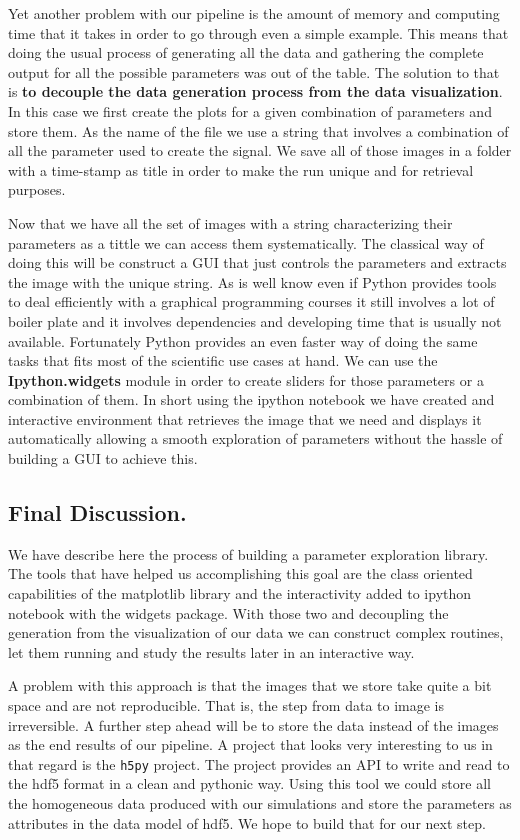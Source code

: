 \documentclass[11pt,a4paper]{article}
\begin{document}
Yet another problem with our pipeline is the amount of memory and
computing time that it takes in order to go through even a simple
example. This means that doing the usual process of generating all the
data and gathering the complete output for all the possible parameters
was out of the table. The solution to that is \textbf{to decouple the
data generation process from the data visualization}. In this case we
first create the plots for a given combination of parameters and store
them. As the name of the file we use a string that involves a
combination of all the parameter used to create the signal. We save all
of those images in a folder with a time-stamp as title in order to make
the run unique and for retrieval purposes.

Now that we have all the set of images with a string characterizing
their parameters as a tittle we can access them systematically. The
classical way of doing this will be construct a GUI that just controls
the parameters and extracts the image with the unique string. As is well know even if Python provides tools to deal efficiently with a graphical programming courses it still involves a lot of boiler plate and it involves dependencies and developing time that is usually not available. 
Fortunately Python provides an even faster way of doing the same tasks that fits most of the scientific use cases at hand. We can use the \textbf{Ipython.widgets} module in order to create sliders for
those parameters or a combination of them. In short using the ipython
notebook we have created and interactive environment that retrieves the
image that we need and displays it automatically allowing a smooth
exploration of parameters without the hassle of building a GUI to
achieve this.

\subsection{Final Discussion.}\label{final-discussion.}

We have describe here the process of building a parameter exploration
library. The tools that have helped us accomplishing this goal are the
class oriented capabilities of the matplotlib library and the
interactivity added to ipython notebook with the widgets package. With
those two and decoupling the generation from the visualization of our
data we can construct complex routines, let them running and study the
results later in an interactive way.

A problem with this approach is that the images that we store take quite
a bit space and are not reproducible. That is, the step from data to
image is irreversible. A further step ahead will be to store the data
instead of the images as the end results of our pipeline. A project that
looks very interesting to us in that regard is the \texttt{h5py}
project. The project provides an API to write and read to the hdf5
format in a clean and pythonic way. Using this tool we could store all
the homogeneous data produced with our simulations and store the
parameters as attributes in the data model of hdf5. We hope to build
that for our next step.




\end{document}
